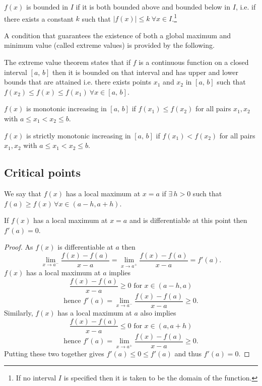 \documentclass[10pt, a4paper]{article}
\begin{document}
\begin{definition}
    $f(x)$ is bounded in $I$ if it is both bounded above and bounded below in $I$, i.e. if there exists a constant $k$ such that $|f(x)| \leq k\ \forall x \in I$.\footnote{If no interval $I$ is specified then it is taken to be the domain of the function.}
\end{definition}

A condition that guarantees the existence of both a global maximum and minimum value (called extreme values) is provided by the following.

The extreme value theorem states that if $f$ is a continuous function on a closed interval $[a,\, b]$ then it is bounded on that interval and has upper and lower bounds that are attained i.e. there exists points $x_1$ and $x_2$ in $[a,\,b]$ such that $f(x_2) \leq f(x) \leq f(x_1)\ \forall x \in [a,\,b]$.

\begin{definition}
    $f(x)$ is monotonic increasing in $[a,\,b]$ if $f(x_1) \leq f(x_2)$ for all pairs $x_1, x_2$ with $a \leq x_1 < x_2 \leq b$.
\end{definition}

\begin{definition}
    $f(x)$ is strictly monotonic increasing in $[a,\,b]$ if $f(x_1) < f(x_2)$ for all pairs $x_1, x_2$ with $a \leq x_1 < x_2 \leq b$.
\end{definition}

\subsection{Critical points}
\begin{definition}
    We say that $f(x)$ has a local maximum at $x = a$ if $\exists\, h > 0$ such that $f(a) \geq f(x)\, \forall x \in (a - h, a + h)$.
\end{definition}

\begin{remark}
    If $f(x)$ has a local maximum at $x = a$ and is differentiable at this point then $f'(a) = 0$.

    \begin{proof}
        As $f(x)$ is differentiable at $a$ then
        \[
        \lim_{x \rightarrow a^{-}}\frac{f(x) - f(a)}{x - a} = \lim_{x \rightarrow a^{+}}\frac{f(x) - f(a)}{x - a} = f'(a).
        \]
        $f(x)$ has a local maximum at $a$ implies
        \[
        \frac{f(x) - f(a)}{x - a} \geq 0 \text{ for } x \in (a - h, a)
        \]
        \[
        \text{hence } f'(a) = \lim_{x \rightarrow a^{-}}\frac{f(x) - f(a)}{x - a} \geq 0.
        \]
        Similarly, $f(x)$ has a local maximum at $a$ also implies
        \[
        \frac{f(x) - f(a)}{x - a} \leq 0 \text{ for } x \in (a, a + h)
        \]
        \[
        \text{hence } f'(a) = \lim_{x \rightarrow a^{+}}\frac{f(x) - f(a)}{x - a} \geq 0.
        \]
        Putting these two together gives $f'(a) \leq 0 \leq f'(a)$ and thus $f'(a) = 0$.
    \end{proof}
\end{remark}
\end{document}
